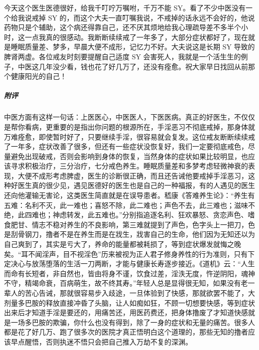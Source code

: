 \begin{case}
    今天这个医生医德很好，给我千叮咛万嘱咐，千万不能 SY。看了不少中医没有一个给我说戒掉 SY 的，而这个大夫一直叮嘱我说，不戒掉的话永远不会好的，他说药物只是个辅助，这个病还得靠自己，还不厌其烦地给我心理疏导差不多半个小时，这一点我真的很感动。我断断续续戒了一年多了，大部分症状都好了，现在就是睡眠质量差、梦多，早晨大便不成形，记忆力不好。大夫说这是长期 SY 导致的脾肾两虚。各位戒友时刻要提醒自己适度 SY 会害死人，我就是一个活生生的例子，中医这几年没少看，钱也花了好几万了，还没有痊愈。祝大家早日找回从前那个健康阳光的自己！
    \subparagraph{附评} 中医方面有这样一句话：上医医心，中医医人，下医医病。真正的好医生，不仅仅是帮你看病，更重要的是指出你问题的根源所在，手淫恶习不彻底戒掉，那身体就万难痊愈，即使暂时好了，只要继续手淫，很容易就会复发。这位戒友断断续续戒了一年多，症状改善了很多，但还有一些症状没恢复好，我们一定要彻底戒色，尽量避免出现破戒，否则会影响到身体的恢复，当然身体的症状如果比较明显，也应该寻求积极治疗，三分治疗，七分戒色养生。睡眠质量差和多梦考虑轻微神衰的表现，大便不成形考虑脾虚，医生的诊断很正确，而且还告诫他要戒掉手淫恶习，这种好医生真的很少见，遇见医德好的医生也是自己的一种福报，有的人遇见的医生还向他灌输无害论，这类医生简直就是在误导患者。嵇康《答难养生论》：“养生有五难：名利不灭，此一难也；喜怒不除，此二难也；声色不去，此三难也；滋味不绝，此四难也；神虑转发，此五难也。”分别指追逐名利、狂欢暴怒、贪恋声色、嗜食肥甘、情志不稳对养生的不良影响，第三难就提到了声色，色字头上一把刀，色是刮骨钢刀，撸者不是在养生而是在戕生，戕害自己的生命，他们因为无知还以为自己爽到了，其实是亏大了，养命的能量都被耗损了，等到症状爆发就悔之晚矣。“耳不闻淫声，目不视淫色”历来被视为正人君子修身养性的行为准则，只有下定决心与放荡堕落的生活一刀两断，才能与健康长寿逐步接近。《道机》云：“人生而命有长短者，非自然也，皆由将身不谨，饮食过差，淫泆无度，忤逆阴阳，魂神不守，精竭命衰，百病萌生，故不终其寿。”年轻人总是显得很无知，如果没有老一辈人的苦心告诫，那就很容易步入歧途，一旦体验到了快感，那就欲罢不能了，大剂量多巴胺的释放直接冲昏了头脑，让人如痴如狂，不顾一切想要快感，等到症状出来后才知道手淫是要还的，用痛苦还，用医药费还，把身体撸废了才知道快感就是一场多巴胺的欺骗，你什么也没有得到，除了一身的症状和无量的痛苦。很多人都是花了好几万、跑了很多次的医院才真正悟明白这个道理的，那些无知的撸者应该早点醒悟，否则执迷不悟只会把自己推入万劫不复的深渊。
\end{case}

